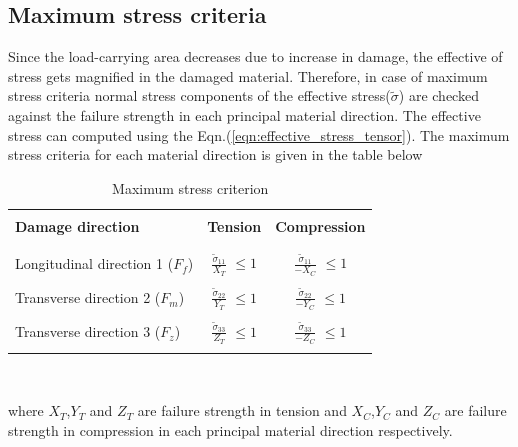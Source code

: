 \documentclass[a4paper,12pt,twoside]{report}
\begin{document}
\subsection{Maximum stress criteria}\label{Maximum stress criteria}
\indent\indent\indent Since the load-carrying area decreases due to increase in damage, the effective of stress gets magnified in the damaged material. Therefore, in case of maximum stress criteria normal stress components of the effective stress($\tilde{\sigma}$) are checked against the failure strength in each principal material direction. The effective stress can computed using the Eqn.(\ref{eqn:effective_stress_tensor}). The maximum stress criteria for each material direction is given in the table below\\
\begin{table}[htbp]
  \begin{center}
     \begin{tabular}{l  c  c} 
     \hline
     \\
      \textbf{Damage direction} \;\;& \textbf{Tension} \;& \textbf{Compression}\\
      \\
      \hline
      \\
      Longitudinal direction 1 ($F_{f}$) & \Large{$\frac{\tilde{\sigma}_{11}}{X_{T}} $}\small{ $\leq 1$} & \Large{$\frac{\tilde{\sigma}_{11}}{-X_{C}} $}\small{ $\leq 1$} \\
      \\
      Transverse direction 2 ($F_{m}$)  &  \Large{$\frac{\tilde{\sigma}_{22}}{Y_{T}} $}\small{ $\leq 1$}  & \Large{$\frac{\tilde{\sigma}_{22}}{-Y_{C}} $}\small{ $\leq 1$}\\
      \\
      Transverse direction 3 ($F_{z}$) &  \Large{$\frac{\tilde{\sigma}_{33}}{Z_{T}} $}\small{ $\leq 1$}  &   \Large{$\frac{\tilde{\sigma}_{33}}{-Z_{C}} $}\small{ $\leq 1$}\\
       \\
       \hline
    \end{tabular}
    \\
    \caption{Maximum stress criterion}
    \label{tab:Maximum stress criterion}
  \end{center}
\end{table}
\FloatBarrier
where $X_{T}$,$ Y_{T} $ and $Z_{T}$ are failure strength in tension and $X_{C}$,$ Y_{C} $ and $Z_{C}$ are failure strength in compression in each principal material direction respectively.\\
\\
\end{document}
